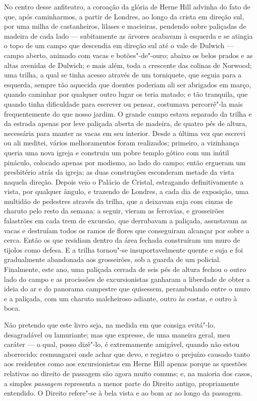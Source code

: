 No centro desse anfiteatro, a coroação da glória de Herne Hill \label{herne}
advinha do fato de que, após caminharmos, a partir de Londres, ao longo
da crista em direção sul, por uma milha de castanheiros, lilases e
macieiras, pendendo sobre paliçadas de madeira de cada lado ---
subitamente as árvores acabavam à esquerda e se atingia o topo de um
campo que descendia em direção sul até o vale de Dulwich --- campo
aberto, animado com vacas e botões"-de"-ouro; abaixo os belos prados e as
altas avenidas de Dulwich; e mais além, toda a crescente das colinas de
Norwood; uma trilha, a qual se tinha acesso através de um torniquete,
que seguia para a esquerda, sempre tão aquecida que doentes poderiam ali
ser abrigados em março, quando caminhar por qualquer outro lugar os
teria matado; e tão tranquila, que quando tinha dificuldade para
escrever ou pensar, costumava percorrê"-la mais frequentemente do que
nosso jardim. O grande campo estava separado da trilha e da estrada
apenas por leve paliçada aberta de madeira, de quatro pés de altura,
necessária para manter as vacas em seu interior. Desde a última vez que
escrevi ou ali meditei, vários melhoramentos foram realizados; primeiro,
a vizinhança queria uma nova igreja e construiu um pobre templo gótico
com um inútil pináculo, colocado apenas por modismo, ao lado do campo;
então ergueram um presbitério atrás da igreja; as duas construções
esconderam metade da vista naquela direção. Depois veio o Palácio de
Cristal, estragando definitivamente a vista, por qualquer ângulo, e
trazendo de Londres, a cada dia de exposição, uma multidão de pedestres
através da trilha, que a deixavam suja com cinzas de charuto pelo resto
da semana: a seguir, vieram as ferrovias, e grosseirões falastrões em
cada trem de excursão, que derrubavam a paliçada, assustavam as vacas e
destruíam todos os ramos de flores que conseguiram alcançar por sobre a
cerca. Então os que residiam dentro da área fechada construíram um muro
de tijolos como defesa. E a trilha tornou"-se insuportavelmente quente e
suja e foi gradualmente abandonada aos grosseirões, sob a guarda de um
policial. Finalmente, este ano, uma paliçada cerrada de seis pés de
altura fechou o outro lado do campo e as procissões de excursionistas
ganharam a liberdade de obter a ideia do ar e do panorama campestre que
quisessem, perambulando entre o muro e a paliçada, com um charuto
malcheiroso adiante, outro às costas, e outro à boca.

Não pretendo que este livro seja, na medida em que consiga evitá"-lo,
desagradável ou lamuriante; mas que expresse, de uma maneira geral, meu
caráter --- o qual, posso dizê"-lo, é extremamente amigável, quando não
estou aborrecido: resmungarei onde achar que devo, e registro o prejuízo
causado tanto aos residentes como aos excursionistas em Herne Hill 
apenas porque as questões relativas ao direito de passagem são agora
muito comuns; e, na maioria dos casos, a simples \textit{passagem}
representa a menor parte do Direito antigo, propriamente entendido. O
Direito refere"-se à bela vista e ao bom ar ao longo da passagem.

